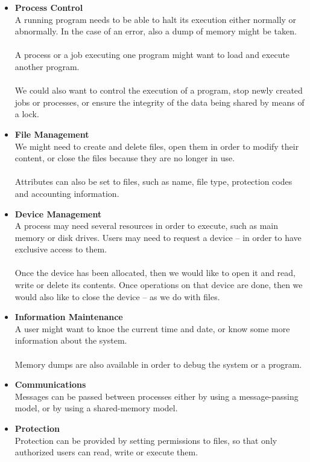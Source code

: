 \documentclass{article}
\begin{document}
\begin{itemize}
	\item \textbf{Process Control}
	\vspace{.2cm} \\
	A running program needs to be able to halt its execution either normally or abnormally. In the case of an error, also a dump of memory might be taken. \\ \\
	A process or a job executing one program might want to load and execute another program. \\ \\
	We could also want to control the execution of a program, stop newly created jobs or processes, or ensure the integrity of the data being shared by means of a lock.
	
	\item \textbf{File Management}
	\vspace{.2cm} \\
	We might need to create and delete files, open them in order to modify their content, or close the files because they are no longer in use. \\ \\
	Attributes can also be set to files, such as name, file type,  protection codes and accounting information.		
	
	\item \textbf{Device Management}
	\vspace{.2cm} \\
	A process may need several resources in order to execute, such as main memory or disk drives. Users may need to request a device -- in order to have exclusive access to them. \\ \\
	Once the device has been allocated, then we would like to open it and read, write or delete its contents. Once operations on that device are done, then we would also like to close the device -- as we do with files.
	
	\item \textbf{Information Maintenance}
	\vspace{.2cm} \\
	A user might want to knoe the current time and date, or know some more information about the system. \\ \\
	Memory dumps are also available in order to debug the system or a program.
	
	\item \textbf{Communications}
	\vspace{.2cm} \\
	Messages can be passed between processes either by using a message-passing model, or by using a shared-memory model.	
	
	\item \textbf{Protection}
	\vspace{.2cm} \\
	Protection can be provided by setting permissions to files, so that only authorized users can read, write or execute them.
\end{itemize}
\end{document}
